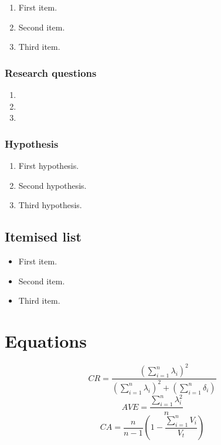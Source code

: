 \begin{enumerate}
    \item First item.
    \item Second item.
    \item Third item.
\end{enumerate}

\subsubsection{Research questions}

\begin{enumerate}[font={\bfseries},label={RQ\arabic*}.,align=left]
    \item \rqone
    \item \rqtwo
    \item \rqthree
\end{enumerate}

\subsubsection{Hypothesis}

\begin{enumerate}[font={\bfseries},label={H\arabic*}.,align=left]
    \item First hypothesis.
    \item Second hypothesis.
    \item Third hypothesis.
\end{enumerate}

\subsection{Itemised list}

\begin{itemize}
    \item First item.
    \item Second item.
    \item Third item.
\end{itemize}

\section{Equations}
\begin{equation}
\label{eq:CR}
CR = \frac{(\sum_{i=1}^n \lambda_i)^2}{(\sum_{i=1}^n \lambda_i)^2+(\sum_{i=1}^n \delta_i)} 
\end{equation}
\begin{equation}
\label{eq:AVE}
AVE = \frac{\sum_{i=1}^n \lambda_i^2}{n}
\end{equation}
\begin{equation}
\label{eq:CA}
CA = \frac{n}{n-1}(1-\frac{\sum_{i=1}^n V_i}{V_t}) 
\end{equation}

